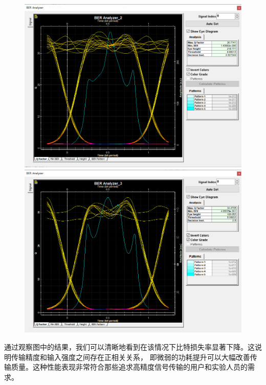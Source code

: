 \documentclass[12pt]{article}
\begin{document}
\begin{figure}[H]
\begin{minipage}[t]{0.5\linewidth}
        \caption{}
        \label{fig:side:b}
      \end{minipage}
	  \begin{minipage}[t]{0.5\linewidth}
        \centering
        \includegraphics[scale=0.2]{sweep2Q3.png}
        \caption{}
        \label{fig:side:a}
      \end{minipage}%
      \begin{minipage}[t]{0.5\linewidth}
        \centering
        \includegraphics[scale=0.2]{sweep2Q4.png}
        \caption{}
        \label{fig:side:b}
      \end{minipage}
\end{figure}
通过观察图中的结果，我们可以清晰地看到在该情况下比特损失率显著下降。这说明传输精度和输入强度之间存在正相关关系，
即微弱的功耗提升可以大幅改善传输质量。这种性能表现非常符合那些追求高精度信号传输的用户和实验人员的需求。
\end{document}
